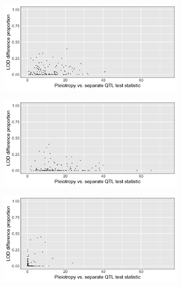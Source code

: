\documentclass{article}
\begin{document}
\begin{figure}
\begin{subfigure}[t]{.38\textwidth}
\centering
\vspace{0pt}%
\includegraphics[width=\linewidth]{bar_3.jpg}
\caption{}\label{fig:fig_c}
\end{subfigure}
%
\begin{subfigure}[t]{.38\textwidth}
\centering
\vspace{0pt}%
\includegraphics[width=\linewidth]{bar_4.jpg}
\caption{}\label{fig:fig_d}
\end{subfigure}
\begin{subfigure}[t]{.38\textwidth}
\centering
\vspace{0pt}%
\includegraphics[width=\linewidth]{bar_5.jpg}

\end{subfigure}
\end{figure}
\end{document}
